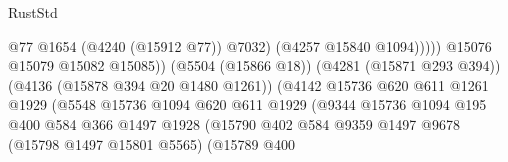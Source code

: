 \begin{lexlean}{RustStd}
\begin{coremodule}
{\begin{coremodule}
{{{{{{{{{{{{{{{{{{{{{{{{{{{{{{{{{{{                                                              @77
                                                              @1654
                                                              (@4240 (@15912 @77))
                                                              @7032)
                                                            (@4257 @15840 @1094)))))
                                                    @15076
                                                    @15079
                                                    @15082
                                                    @15085))
                                                (@5504 (@15866 @18))
                                                (@4281 (@15871 @293 @394))
                                                (@4136 (@15878 @394 @20 @1480 @1261))
                                                (@4142
                                                  @15736
                                                  @620
                                                  @611
                                                  @1261
                                                  @1929
                                                  (@5548
                                                    @15736
                                                    @1094
                                                    @620
                                                    @611
                                                    @1929
                                                    (@9344
                                                      @15736
                                                      @1094
                                                      @195
                                                      @400
                                                      @584
                                                      @366
                                                      @1497
                                                      @1928
                                                      (@15790
                                                        @402
                                                        @584
                                                        @9359
                                                        @1497
                                                        @9678
                                                        (@15798 @1497 @15801 @5565)
                                                        (@15789
                                                          @400
}}}}}}}}}}}}}}}}}}}}}}}}}}}}}}}}}}}
\end{coremodule}}
\end{coremodule}
\end{lexlean}
